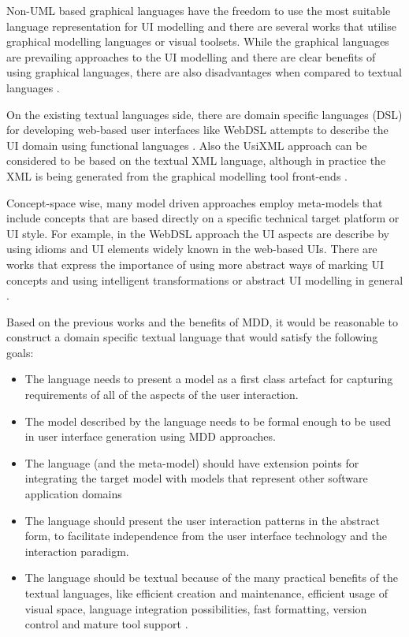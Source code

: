 \documentclass[conference]{IEEEtran}
\begin{document}
Non-UML based graphical languages have the freedom to use the most suitable
language representation for UI modelling and there are several works
\cite{Trtteberg01modelbased,Ceri00webmodeling,Goderis04adeclarative} that
utilise graphical modelling languages or visual toolsets. While the graphical
languages are prevailing approaches to the UI modelling and there are clear
benefits of using graphical languages, there are also disadvantages when
compared to textual languages \cite{GronnigerKrahn07TextbasedModeling}.

On the existing textual languages side, there are domain specific languages
(DSL) for developing web-based user interfaces like WebDSL \cite{Visser_2008}
attempts to describe the UI domain using functional languages
\cite{Plasmeijer2009}. Also the UsiXML approach \cite{Limbourg04} can be
considered to be based on the textual XML language, although in practice the
XML is being generated from the graphical modelling tool front-ends
\cite{Vanderdonckt05}.

Concept-space wise, many model driven approaches employ meta-models that
include concepts that are based directly on a specific technical target
platform or UI style. For example, in the WebDSL approach the UI aspects are
describe by using idioms and UI elements widely known in the web-based UIs.
There are works that express the importance of using more abstract ways of
marking UI concepts and using intelligent transformations
\cite{Borchers2000,AhmedAshraf2007} or abstract UI modelling in general
\cite{Limbourg04}.

Based on the previous works and the benefits
\cite{KellyTolvanen08DomainSpecific} of MDD, it would be reasonable to
construct a domain specific textual language that would satisfy the following
goals:

\begin{itemize}
  \item The language needs to present a model as a first class artefact for
    capturing requirements of all of the aspects of the user interaction.
  \item The model described by the language needs to be formal enough to be
    used in user interface generation using MDD approaches.
  \item The language (and the meta-model) should have extension points for
    integrating the target model with models that represent other software
    application domains
  \item The language should present the user interaction patterns in the
    abstract form, to facilitate independence from the user interface
    technology and the interaction paradigm.
  \item The language should be textual because of the many practical benefits
    of the textual languages, like efficient creation and maintenance,
    efficient usage of visual space, language integration possibilities, fast
    formatting, version control and mature tool support
    \cite{GronnigerKrahn07TextbasedModeling}.
\end{itemize}
\end{document}
